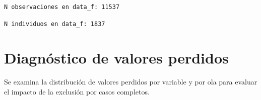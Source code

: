 \documentclass[
  spanish,
  a4paper,
  oneside]{scrbook}
\newenvironment{Shaded}{\begin{snugshade}}{\end{snugshade}}
\newcommand{\FunctionTok}[1]{\textcolor[rgb]{0.28,0.35,0.67}{#1}}
\newcommand{\NormalTok}[1]{\textcolor[rgb]{0.00,0.23,0.31}{#1}}
\newcommand{\SpecialCharTok}[1]{\textcolor[rgb]{0.37,0.37,0.37}{#1}}
\newcommand{\StringTok}[1]{\textcolor[rgb]{0.13,0.47,0.30}{#1}}
\begin{document}
\begin{verbatim}
N observaciones en data_f: 11537 
\end{verbatim}

\begin{Shaded}
\end{Shaded}

\begin{verbatim}
N individuos en data_f: 1837 
\end{verbatim}

\chapter{Diagnóstico de valores
perdidos}\label{diagnuxf3stico-de-valores-perdidos}

Se examina la distribución de valores perdidos por variable y por ola
para evaluar el impacto de la exclusión por casos completos.
\end{document}
